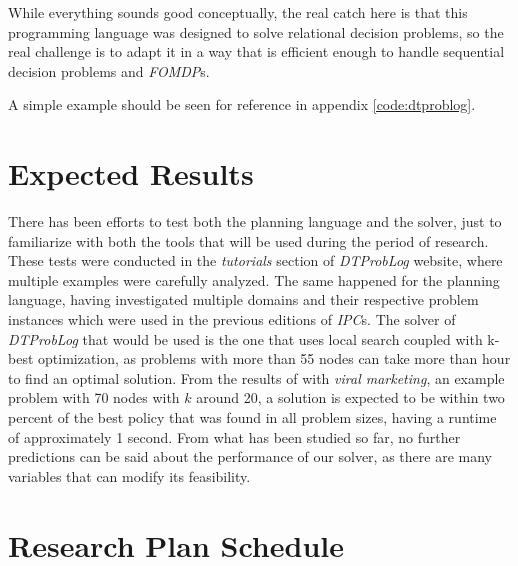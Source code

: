 While everything sounds good conceptually, the real catch here is that this
programming language was designed to solve relational decision problems, so the
real challenge is to adapt it in a way that is efficient enough to handle
sequential decision problems and \textit{FOMDP}s.

A simple example should be seen for reference in appendix \ref{code:dtproblog}.

\section{Expected Results}

There has been efforts to test both the planning language and the solver, just
to familiarize with both the tools that will be used during the period of
research. These tests were conducted in the \textit{tutorials} section of
\textit{DTProbLog} website, where multiple examples were carefully analyzed. The
same happened for the planning language, having investigated multiple domains
and their respective problem instances which were used in the previous editions
of \textit{IPC}s.
The solver of \textit{DTProbLog} that would be used is the one that uses local
search coupled with k-best optimization, as problems with more than 55 nodes can
take more than hour to find an optimal solution. From the results of
\cite{Broeck2010} with \textit{viral marketing}, an example problem with
70 nodes with $k$ around 20, a solution is expected to be within two
percent of the best policy that was found in all problem sizes, having a runtime
of approximately 1 second.
From what has been studied so far, no further predictions can
be said about the performance of our solver, as there are many variables that
can modify its feasibility.

\section{Research Plan Schedule}

